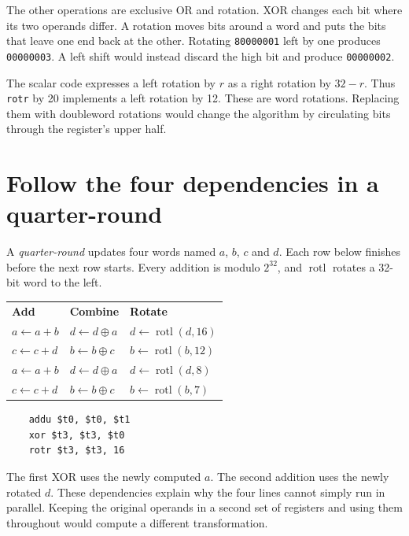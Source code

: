 The other operations are exclusive OR and rotation. XOR changes each bit where
its two operands differ. A rotation moves bits around a word and puts the bits
that leave one end back at the other. Rotating \texttt{80000001} left by one
produces \texttt{00000003}. A left shift would instead discard the high bit and
produce \texttt{00000002}.

The scalar code expresses a left rotation by $r$ as a right rotation by
$32-r$. Thus \texttt{rotr} by 20 implements a left rotation by 12. These are
word rotations. Replacing them with doubleword rotations would change the
algorithm by circulating bits through the register's upper half.

\section{Follow the four dependencies in a quarter-round}

A \emph{quarter-round} updates four words named $a$, $b$, $c$ and $d$.
Each row below finishes before the next row starts. Every addition is modulo
$2^{32}$, and $\operatorname{rotl}$ rotates a 32-bit word to the left.

\begin{center}
  \begin{tabular}{lll}
    \textbf{Add} & \textbf{Combine}            & \textbf{Rotate}                   \\
    $a\gets a+b$ & $d\gets d\mathbin{\oplus}a$ & $d\gets\operatorname{rotl}(d,16)$ \\
    $c\gets c+d$ & $b\gets b\mathbin{\oplus}c$ & $b\gets\operatorname{rotl}(b,12)$ \\
    $a\gets a+b$ & $d\gets d\mathbin{\oplus}a$ & $d\gets\operatorname{rotl}(d,8)$  \\
    $c\gets c+d$ & $b\gets b\mathbin{\oplus}c$ & $b\gets\operatorname{rotl}(b,7)$
  \end{tabular}
\end{center}

\begin{verbatim}
    addu $t0, $t0, $t1
    xor $t3, $t3, $t0
    rotr $t3, $t3, 16
\end{verbatim}

The first XOR uses the newly computed $a$. The second addition uses the newly
rotated $d$. These dependencies explain why the four lines cannot simply run
in parallel. Keeping the original operands in a second set of registers and
using them throughout would compute a different transformation.

